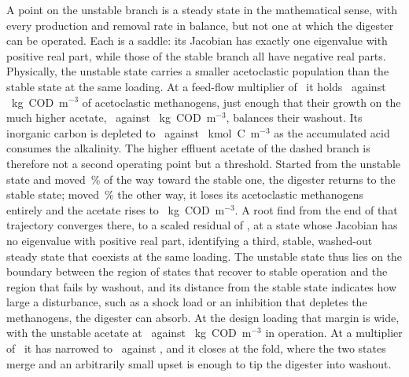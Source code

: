 \documentclass{article}
\begin{document}
A point on the unstable branch is a steady state in the mathematical sense, with every production and removal rate in balance, but not one at which the digester can be operated. Each is a saddle: its Jacobian has exactly one eigenvalue with positive real part, while those of the stable branch all have negative real parts. Physically, the unstable state carries a smaller acetoclastic population than the stable state at the same loading. At a feed-flow multiplier of \SteadyUnsLam\ it holds \SteadyUnsXacUns\ against \SteadyUnsXacSt~kg~COD~m\(^{-3}\) of acetoclastic methanogens, just enough that their growth on the much higher acetate, \SteadyUnsSacUns\ against \SteadyUnsSacSt~kg~COD~m\(^{-3}\), balances their washout. Its inorganic carbon is depleted to \SteadyUnsSicUns\ against \SteadyUnsSicSt~kmol~C~m\(^{-3}\) as the accumulated acid consumes the alkalinity. The higher effluent acetate of the dashed branch is therefore not a second operating point but a threshold. Started from the unstable state and moved \SteadyUnsNudgePct\,\% of the way toward the stable one, the digester returns to the stable state; moved \SteadyUnsNudgePct\,\% the other way, it loses its acetoclastic methanogens entirely and the acetate rises to \SteadyUnsSacWash~kg~COD~m\(^{-3}\). A root find from the end of that trajectory converges there, to a scaled residual of \SteadyUnsWashResid, at a state whose Jacobian has no eigenvalue with positive real part, identifying a third, stable, washed-out steady state that coexists at the same loading. The unstable state thus lies on the boundary between the region of states that recover to stable operation and the region that fails by washout, and its distance from the stable state indicates how large a disturbance, such as a shock load or an inhibition that depletes the methanogens, the digester can absorb. At the design loading that margin is wide, with the unstable acetate at \SteadyUnsSacDesUns\ against \SteadyUnsSacDesSt~kg~COD~m\(^{-3}\) in operation. At a multiplier of \SteadyUnsLamNear\ it has narrowed to \SteadyUnsSacNearUns\ against \SteadyUnsSacNearSt, and it closes at the fold, where the two states merge and an arbitrarily small upset is enough to tip the digester into washout.
\end{document}

